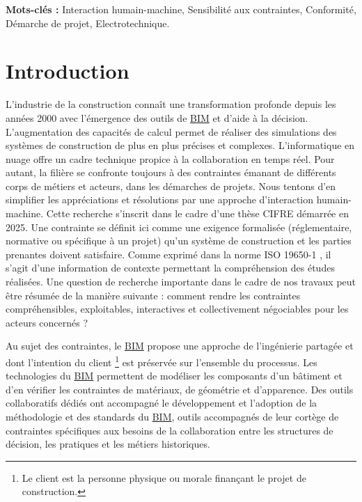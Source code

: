 \documentclass[a4paper,12pt]{article}
\newenvironment{keyword}{\begin{trivlist}\item[]{\bfseries Mots-clés :}}{\end{trivlist}}
\begin{document}
\begin{keyword}
Interaction humain-machine, Sensibilité aux contraintes, Conformité, Démarche de projet, Electrotechnique.
\end{keyword}
\section{Introduction}
\label{sec:org344f342}
L’industrie de la construction connaît une transformation profonde depuis les années 2000 avec l’émergence des outils de \protect\hyperlink{gls-1}{\label{gls-1-use-3}BIM} et d’aide à la décision. L’augmentation des capacités de calcul permet de réaliser des simulations des systèmes de construction de plus en plus précises et complexes. L’informatique en nuage  offre un cadre technique propice à la collaboration en temps réel. Pour autant, la filière se confronte toujours à des contraintes émanant de différents corps de métiers et acteurs, dans les démarches de projets. Nous tentons d’en simplifier les appréciations et résolutions par une approche d’interaction humain-machine. Cette recherche s’inscrit dans le cadre d’une thèse CIFRE démarrée en 2025. Une contrainte se définit ici comme une exigence formalisée (réglementaire, normative ou spécifique à un projet) qu’un système de construction et les parties prenantes doivent satisfaire. Comme exprimé dans la norme ISO 19650-1 \autocite{OrganisationNumerisationInformations2018a}, il s’agit d’une information de contexte permettant la compréhension des études réalisées.  Une question de recherche importante dans le cadre de nos travaux peut être résumée de la manière suivante : comment rendre les contraintes compréhensibles, exploitables, interactives et collectivement négociables pour les acteurs concernés ?

Au sujet des contraintes, le \protect\hyperlink{gls-1}{\label{gls-1-use-4}BIM} propose une approche de l'ingénierie partagée et dont l’intention du client \footnote{Le client est la personne physique ou morale finançant le projet de construction.} est préservée sur l’ensemble du processus. Les technologies du \protect\hyperlink{gls-1}{\label{gls-1-use-5}BIM} permettent de modéliser les composants d'un bâtiment et d'en vérifier les contraintes de matériaux, de géométrie et d’apparence. Des outils collaboratifs dédiés ont accompagné le développement et l’adoption de la méthodologie et des standards du \protect\hyperlink{gls-1}{\label{gls-1-use-6}BIM}, outils accompagnés de leur cortège de contraintes spécifiques aux besoins de la collaboration entre les structures de décision, les pratiques et les métiers historiques. 
\end{document}
